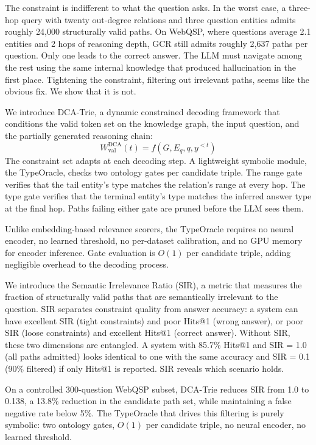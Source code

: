 The constraint is indifferent to what the question asks. In the worst case, a
three-hop query with twenty out-degree relations and three question entities admits
roughly 24{,}000 structurally valid paths. On WebQSP, where questions average 2.1
entities and 2 hops of reasoning depth, GCR still admits roughly 2{,}637 paths per
question. Only one leads to the correct answer. The LLM must navigate among the rest
using the same internal knowledge that produced hallucination in the first place.
Tightening the constraint, filtering out irrelevant paths, seems like the obvious fix.
We show that it is not.

We introduce DCA-Trie, a dynamic constrained decoding framework that conditions the
valid token set on the knowledge graph, the input question, and the partially generated
reasoning chain:
\begin{equation}
      W_{\text{val}}^{\text{DCA}}(t) = f(G, E_q, q, y^{<t})
      \label{eq:dca_constraint}
\end{equation}
The constraint set adapts at each decoding step. A lightweight symbolic module, the
TypeOracle, checks two ontology gates per candidate triple. The range gate verifies
that the tail entity's type matches the relation's range at every hop. The type gate
verifies that the terminal entity's type matches the inferred answer type at the final
hop. Paths failing either gate are pruned before the LLM sees them.

Unlike embedding-based relevance scorers, the TypeOracle requires no neural encoder, no
learned threshold, no per-dataset calibration, and no GPU memory for encoder inference.
Gate evaluation is $O(1)$ per candidate triple, adding negligible overhead to the
decoding process.

We introduce the Semantic Irrelevance Ratio (SIR), a metric that measures the fraction
of structurally valid paths that are semantically irrelevant to the question. SIR
separates constraint quality from answer accuracy: a system can have excellent SIR
(tight constraints) and poor Hits@1 (wrong answer), or poor SIR (loose constraints) and
excellent Hits@1 (correct answer). Without SIR, these two dimensions are entangled. A
system with 85.7\% Hits@1 and SIR = 1.0 (all paths admitted) looks identical to one
with the same accuracy and SIR = 0.1 (90\% filtered) if only Hits@1 is reported. SIR
reveals which scenario holds.

On a controlled 300-question WebQSP subset, DCA-Trie reduces SIR from 1.0 to 0.138, a
13.8\% reduction in the candidate path set, while maintaining a false negative rate
below 5\%. The TypeOracle that drives this filtering is purely symbolic: two ontology
gates, $O(1)$ per candidate triple, no neural encoder, no learned threshold.

